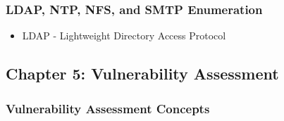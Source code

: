 \subsubsection{LDAP, NTP, NFS, and SMTP Enumeration}
\begin{itemize}
    \item LDAP - Lightweight Directory Access Protocol
\end{itemize}

\subsection{Chapter 5: Vulnerability Assessment}
\subsubsection{Vulnerability Assessment Concepts}
